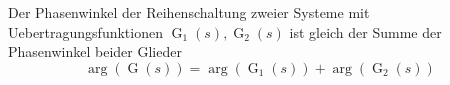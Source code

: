 Der Phasenwinkel der Reihenschaltung zweier Systeme mit Uebertragungsfunktionen $\operatorname{G}_1(s), \operatorname{G}_2(s)$ ist gleich der Summe der Phasenwinkel beider Glieder
$$\operatorname{arg}(\operatorname{G}(s)) = \operatorname{arg}(\operatorname{G}_1(s)) + \operatorname{arg}(\operatorname{G}_2(s))$$

